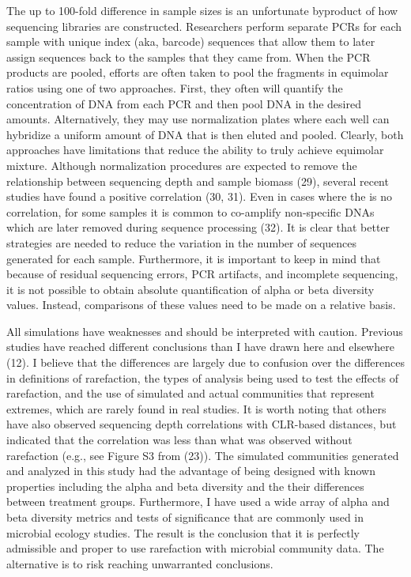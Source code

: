 \documentclass[
]{article}
\begin{document}
The up to 100-fold difference in sample sizes is an unfortunate
byproduct of how sequencing libraries are constructed. Researchers
perform separate PCRs for each sample with unique index (aka, barcode)
sequences that allow them to later assign sequences back to the samples
that they came from. When the PCR products are pooled, efforts are often
taken to pool the fragments in equimolar ratios using one of two
approaches. First, they often will quantify the concentration of DNA
from each PCR and then pool DNA in the desired amounts. Alternatively,
they may use normalization plates where each well can hybridize a
uniform amount of DNA that is then eluted and pooled. Clearly, both
approaches have limitations that reduce the ability to truly achieve
equimolar mixture. Although normalization procedures are expected to
remove the relationship between sequencing depth and sample biomass
(29), several recent studies have found a positive correlation (30, 31).
Even in cases where the is no correlation, for some samples it is common
to co-amplify non-specific DNAs which are later removed during sequence
processing (32). It is clear that better strategies are needed to reduce
the variation in the number of sequences generated for each sample.
Furthermore, it is important to keep in mind that because of residual
sequencing errors, PCR artifacts, and incomplete sequencing, it is not
possible to obtain absolute quantification of alpha or beta diversity
values. Instead, comparisons of these values need to be made on a
relative basis.

All simulations have weaknesses and should be interpreted with caution.
Previous studies have reached different conclusions than I have drawn
here and elsewhere (12). I believe that the differences are largely due
to confusion over the differences in definitions of rarefaction, the
types of analysis being used to test the effects of rarefaction, and the
use of simulated and actual communities that represent extremes, which
are rarely found in real studies. It is worth noting that others have
also observed sequencing depth correlations with CLR-based distances,
but indicated that the correlation was less than what was observed
without rarefaction (e.g., see Figure S3 from (23)). The simulated
communities generated and analyzed in this study had the advantage of
being designed with known properties including the alpha and beta
diversity and the their differences between treatment groups.
Furthermore, I have used a wide array of alpha and beta diversity
metrics and tests of significance that are commonly used in microbial
ecology studies. The result is the conclusion that it is perfectly
admissible and proper to use rarefaction with microbial community data.
The alternative is to risk reaching unwarranted conclusions.
\end{document}
